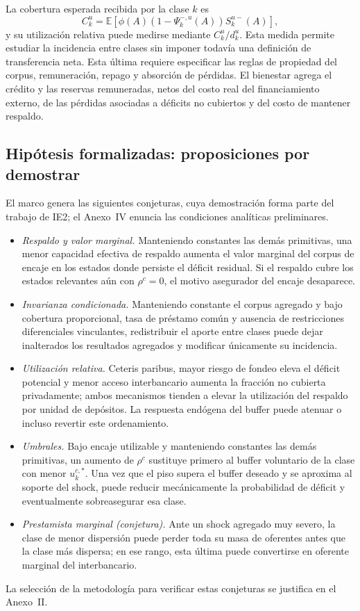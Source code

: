 \documentclass[11pt,a4paper]{article}
\begin{document}
La cobertura esperada recibida por la clase $k$ es
\begin{equation}
C_k^u
=
\mathbb{E}\!\left[
\phi(A)
\left(1-\Psi^{-,u}_k(A)\right)
S^{u-}_k(A)
\right],
\end{equation}
y su utilización relativa puede medirse mediante $C_k^u/d_k^u$. Esta medida permite estudiar la incidencia entre clases sin imponer todavía una definición de transferencia neta. Esta última requiere especificar las reglas de propiedad del corpus, remuneración, repago y absorción de pérdidas. El bienestar agrega el crédito y las reservas remuneradas, netos del costo real del financiamiento externo, de las pérdidas asociadas a déficits no cubiertos y del costo de mantener respaldo.

\subsection{Hipótesis formalizadas: proposiciones por demostrar}
El marco genera las siguientes conjeturas, cuya demostración forma parte del trabajo de IE2; el Anexo~IV enuncia las condiciones analíticas preliminares.
\begin{itemize}[leftmargin=1.4em,itemsep=2pt]
\item[P1.] \emph{Respaldo y valor marginal}\emph{.} Manteniendo constantes las demás primitivas, una menor capacidad efectiva de respaldo aumenta el valor marginal del corpus de encaje en los estados donde persiste el déficit residual. Si el respaldo cubre los estados relevantes aún con $\rho^c=0$, el motivo asegurador del encaje desaparece.
\item[P2.] \emph{Invarianza condicionada.} Manteniendo constante el corpus agregado y bajo cobertura proporcional, tasa de préstamo común y ausencia de restricciones diferenciales vinculantes, redistribuir el aporte entre clases puede dejar inalterados los resultados agregados y modificar únicamente su incidencia.
\item[P3.] \emph{Utilización relativa.} Ceteris paribus, mayor riesgo de fondeo eleva el déficit potencial y menor acceso interbancario aumenta la fracción no cubierta privadamente; ambos mecanismos tienden a elevar la utilización del respaldo por unidad de depósitos. La respuesta endógena del buffer puede atenuar o incluso revertir este ordenamiento.
\item[P4.] \emph{Umbrales.} Bajo encaje utilizable y manteniendo constantes las demás primitivas, un aumento de $\rho^c$ sustituye primero al buffer voluntario de la clase con menor $u_k^{c,*}$. Una vez que el piso supera el buffer deseado y se aproxima al soporte del shock, puede reducir mecánicamente la probabilidad de déficit y eventualmente sobreasegurar esa clase.
\item[P5.] \emph{Prestamista marginal (conjetura).} Ante un shock agregado muy severo, la clase de menor dispersión puede perder toda su masa de oferentes antes que la clase más dispersa; en ese rango, esta última puede convertirse en oferente marginal del interbancario.
\end{itemize}
La selección de la metodología para verificar estas conjeturas se justifica en el Anexo~II.
\end{document}
